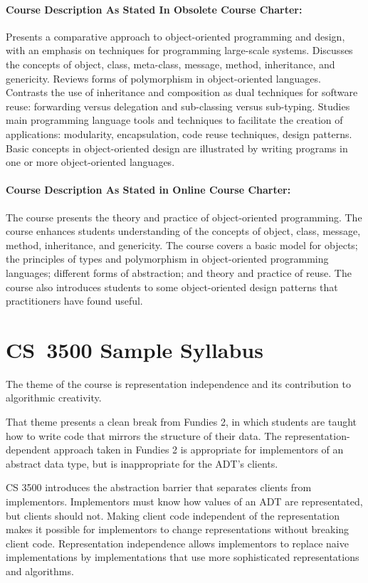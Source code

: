 \documentclass[11pt]{article}
\begin{document}
\paragraph{Course Description As Stated In Obsolete Course Charter:}
%
Presents a comparative approach to object-oriented
programming and design, with an emphasis on techniques for programming
large-scale systems. Discusses the concepts of object, class,
meta-class, message, method, inheritance, and genericity. Reviews
forms of polymorphism in object-oriented languages. Contrasts the use
of inheritance and composition as dual techniques for software reuse:
forwarding versus delegation and sub-classing versus
sub-typing. Studies main programming language tools and techniques to 
facilitate the creation of applications: modularity, encapsulation,
code reuse techniques, design patterns. Basic concepts in
object-oriented design are illustrated by writing programs in one or
more object-oriented languages. 

\paragraph{Course Description As Stated in Online Course Charter:}
%
The course presents the theory and practice of object-oriented
programming. The course enhances students understanding of the
concepts of object, class, message, method, inheritance, and
genericity. The course covers a basic model for objects; the
principles of types and polymorphism in object-oriented programming
languages; different forms of abstraction; and theory and practice
of reuse. The course also introduces students to some
object-oriented design patterns that practitioners have found useful. 

\pagebreak

\section*{CS~3500 Sample Syllabus}

The theme of the course is representation independence and
its contribution to algorithmic creativity.

That theme presents a clean break from Fundies 2, in which
students are taught how to write code that mirrors the
structure of their data.  The representation-dependent
approach taken in Fundies 2 is appropriate for implementors
of an abstract data type, but is inappropriate for the ADT's
clients.

CS 3500 introduces the abstraction barrier that separates
clients from implementors.  Implementors must know how values
of an ADT are representated, but clients should not.  Making
client code independent of the representation makes it possible
for implementors to change representations without breaking
client code.  Representation independence allows implementors
to replace naive implementations by implementations that use
more sophisticated representations and algorithms.
\end{document}
